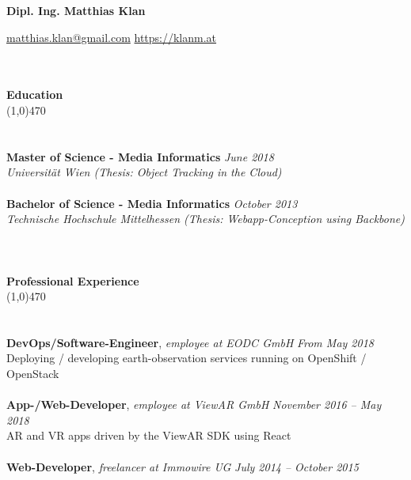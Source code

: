\documentclass[10pt]{article} %
\begin{document}
\centerline{{\LARGE \bf Dipl. Ing. Matthias Klan}}
\centerline{\href{mailto:matthias.klan@gmail.com}{matthias.klan@gmail.com} \raisebox{0.25ex}{\tiny$\bullet$} \href{https://klanm.at}{https://klanm.at}}

\noindent %
\\\\
{\Large \bf Education}\\
\line(1,0){470}\\
\\\\
\noindent
{\bf Master of Science - Media Informatics} \hfill \textit{June 2018} \\ 
\textit{Universität Wien (Thesis: Object Tracking in the Cloud)}\\\\
\noindent
{\bf Bachelor of Science - Media Informatics} \hfill \textit{October 2013} \\
\textit{Technische Hochschule Mittelhessen (Thesis: Webapp-Conception using Backbone)}\\
\\
\noindent %
\\\\
{\Large \bf Professional Experience}\\
\line(1,0){470}\\
\\\\
\noindent
{\bf DevOps/Software-Engineer}, \textit{employee at EODC GmbH}  \hfill \textit{ From May 2018 } \\ 
Deploying / developing earth-observation services running on OpenShift / OpenStack\\\\
\noindent
\noindent
{\bf App-/Web-Developer}, \textit{employee at ViewAR GmbH}  \hfill \textit{ November 2016 -- May 2018 } \\ 
AR and VR apps driven by the ViewAR SDK using React\\\\
\noindent
{\bf Web-Developer}, \textit{freelancer at Immowire UG}  \hfill \textit{ July 2014 -- October 2015 } \\ 
\end{document}
